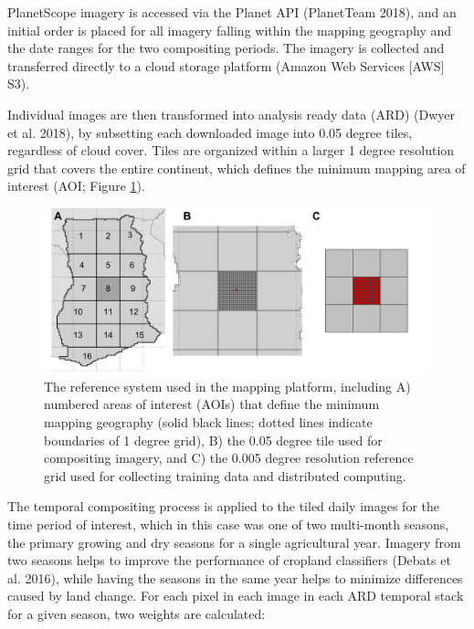 \documentclass[11pt,a4paper]{article}
\begin{document}
PlanetScope imagery is accessed via the Planet API (PlanetTeam 2018),
and an initial order is placed for all imagery falling within the
mapping geography and the date ranges for the two compositing periods.
The imagery is collected and transferred directly to a cloud storage
platform (Amazon Web Services {[}AWS{]} S3).

Individual images are then transformed into analysis ready data (ARD)
(Dwyer et al. 2018), by subsetting each downloaded image into 0.05
degree tiles, regardless of cloud cover. Tiles are organized within a
larger 1 degree resolution grid that covers the entire continent, which
defines the minimum mapping area of interest (AOI; Figure
\ref{fig:aois}).

\begin{figure}

{\centering \includegraphics[width=1\linewidth]{figures/figure2} 

}

\caption{The reference system used in the mapping platform, including A) numbered areas of interest (AOIs) that define the minimum mapping geography (solid black lines; dotted lines indicate boundaries of 1 degree grid), B) the 0.05 degree tile used for compositing imagery, and C) the 0.005 degree resolution reference grid used for collecting training data and distributed computing.}\label{fig:aois}
\end{figure}

The temporal compositing process is applied to the tiled daily images
for the time period of interest, which in this case was one of two
multi-month seasons, the primary growing and dry seasons for a single
agricultural year. Imagery from two seasons helps to improve the
performance of cropland classifiers (Debats et al. 2016), while having
the seasons in the same year helps to minimize differences caused by
land change. For each pixel in each image in each ARD temporal stack for
a given season, two weights are calculated:
\end{document}
